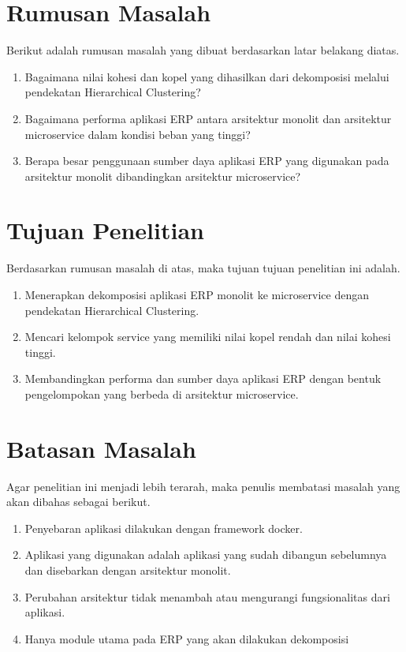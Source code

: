 \section{Rumusan Masalah}
Berikut adalah rumusan masalah yang dibuat berdasarkan latar belakang diatas.
\begin{enumerate}[nolistsep,leftmargin=0.5cm]
  \item Bagaimana nilai kohesi dan kopel yang dihasilkan dari dekomposisi melalui pendekatan Hierarchical Clustering?
  \item Bagaimana performa aplikasi ERP antara arsitektur monolit dan arsitektur microservice dalam kondisi beban yang tinggi?
  \item Berapa besar penggunaan sumber daya aplikasi ERP yang digunakan pada arsitektur monolit dibandingkan arsitektur microservice?\\
\end{enumerate}

\section{Tujuan Penelitian}
Berdasarkan rumusan masalah di atas, maka tujuan tujuan penelitian ini adalah.
\begin{enumerate}[nolistsep,leftmargin=0.5cm]
  \item Menerapkan dekomposisi aplikasi ERP monolit ke microservice dengan pendekatan Hierarchical Clustering.
  \item Mencari kelompok service yang memiliki nilai kopel rendah dan nilai kohesi tinggi.
  \item Membandingkan performa dan sumber daya aplikasi ERP dengan bentuk pengelompokan yang berbeda di arsitektur microservice. \\
\end{enumerate}

\section{Batasan Masalah}
Agar penelitian ini menjadi lebih terarah, maka penulis membatasi masalah yang akan dibahas sebagai berikut.
\begin{enumerate}[nolistsep,leftmargin=0.5cm]
  \item Penyebaran aplikasi dilakukan dengan framework docker.
  \item Aplikasi yang digunakan adalah aplikasi yang sudah dibangun sebelumnya dan disebarkan dengan arsitektur monolit.
  \item Perubahan arsitektur tidak menambah atau mengurangi fungsionalitas dari aplikasi.\\
  \item Hanya module utama pada ERP yang akan dilakukan dekomposisi
\end{enumerate}

